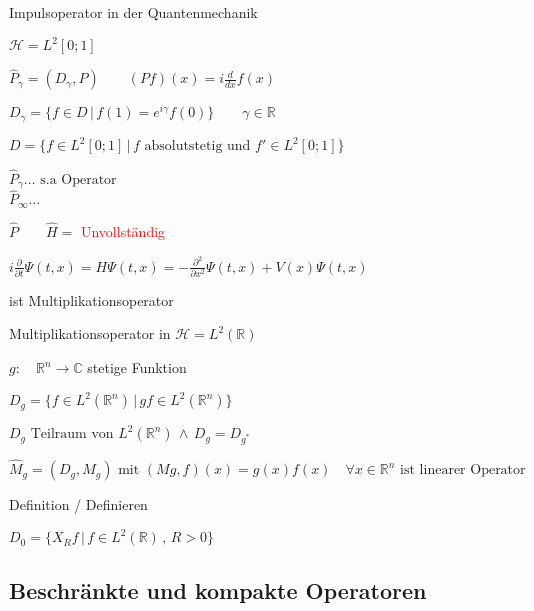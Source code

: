 \begin{Bsp}{Impulsoperator in der Quantenmechanik}

    $\mathcal{H} = L^2[0;1]$

    $\hat{P}_\gamma = (D_\gamma , P) \qquad (Pf)(x) = i \frac{d}{dx} f(x)$

    $D_\gamma =  \{ f \in D \, | \, f(1) = e^{i \gamma} f(0) \} \qquad \gamma \in \mathbb{R}$

    $D = \{ f \in L^2[0;1] \, | \, f \textrm{ absolutstetig und } f' \in L^2[0;1] \}$

    $\hat{P}_\gamma \dots \textrm{ s.a Operator}$ \\
    $\hat{P}_\infty \dots$
    
    $\hat{P} \qquad \hat{H} = $ \textcolor{red}{Unvollständig}

    $i \frac{\partial}{\partial t} \Psi (t,x) = H \Psi (t,x) = - \frac{\partial^2}{\partial x^2}
            \Psi (t,x) + V(x) \Psi (t,x)$

    \hspace{25px}
        	 ist Multiplikationsoperator
\end{Bsp}

\begin{Bsp}{Multiplikationsoperator in $\mathcal{H} = L^2(\mathbb{R})$}
    
    $g: \quad \mathbb{R}^n \rightarrow \mathbb{C}$ stetige Funktion

    $D_g = \{ f \in L^2(\mathbb{R}^n) \, | \, gf \in L^2(\mathbb{R}^n) \}$

    $D_g \textrm{ Teilraum von } L^2(\mathbb{R}^n) \, \wedge \, D_g = D_{g^\ast}$

    $\hat{M}_g = (D_g, M_g) \textrm{ mit } (Mg , f)(x) = g(x)f(x) \quad \forall x \in \mathbb{R}^n
        \textrm{ ist linearer Operator}$

    Definition / Definieren

    $D_0 = \{X_R f \, | \, f \in L^2(\mathbb{R}) \, , \, R > 0 \} $
\end{Bsp}

\subsection{Beschränkte und kompakte Operatoren}





